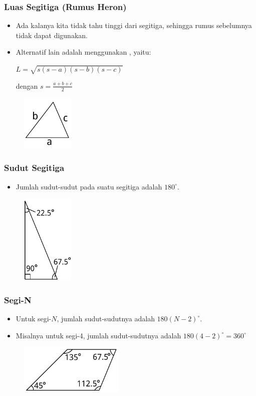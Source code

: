 \begin{frame}
\frametitle{Luas Segitiga (Rumus Heron)}
\begin{itemize}
  \item Ada kalanya kita tidak tahu tinggi dari segitiga, sehingga rumus sebelumnya tidak dapat digunakan.
  \item Alternatif lain adalah menggunakan , yaitu:\newline
    
  \(\displaystyle L = \sqrt{s(s-a)(s-b)(s-c)} \) \newline 
  
  dengan \(\displaystyle s = \frac{a+b+c}{2}\)
  
\end{itemize}
\begin{figure}
  \includegraphics[width=2.5cm]{asset/triangle-heron.pdf}
\end{figure}
\end{frame}

\begin{frame}
\frametitle{Sudut Segitiga}
\begin{itemize}
  \item Jumlah sudut-sudut pada suatu segitiga adalah $180^{\circ}$.
\end{itemize}
\begin{figure}
  \includegraphics[width=2.5cm]{asset/triangle-angle.pdf}
\end{figure}
\end{frame}

\begin{frame}
\frametitle{Segi-N}
\begin{itemize}
  \item Untuk segi-$N$, jumlah sudut-sudutnya adalah $180(N - 2)^{\circ}$.
  \item Misalnya untuk segi-4, jumlah sudut-sudutnya adalah $180(4 - 2)^{\circ} = 360^{\circ}$
\end{itemize}
\begin{figure}
  \includegraphics[width=5cm]{asset/quadrangle-angle.pdf}
\end{figure}
\end{frame}

